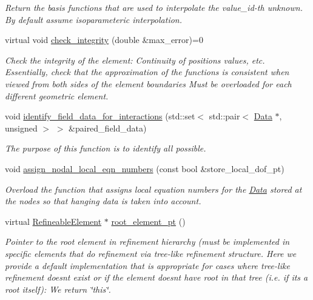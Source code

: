 \begin{DoxyCompactItemize}
\begin{DoxyCompactList}\small\item\em Return the basis functions that are used to interpolate the value\+\_\+id-\/th unknown. By default assume isoparameteric interpolation. \end{DoxyCompactList}\item 
virtual void \hyperlink{classoomph_1_1RefineableElement_ae665f2d2eb0b6410ddcb101caa80922a}{check\+\_\+integrity} (double \&max\+\_\+error)=0
\begin{DoxyCompactList}\small\item\em Check the integrity of the element\+: Continuity of positions values, etc. Essentially, check that the approximation of the functions is consistent when viewed from both sides of the element boundaries Must be overloaded for each different geometric element. \end{DoxyCompactList}\item 
void \hyperlink{classoomph_1_1RefineableElement_acad7a1ad82b7d818ddbec4200b339ade}{identify\+\_\+field\+\_\+data\+\_\+for\+\_\+interactions} (std\+::set$<$ std\+::pair$<$ \hyperlink{classoomph_1_1Data}{Data} $\ast$, unsigned $>$ $>$ \&paired\+\_\+field\+\_\+data)
\begin{DoxyCompactList}\small\item\em The purpose of this function is to identify all possible. \end{DoxyCompactList}\item 
void \hyperlink{classoomph_1_1RefineableElement_ab2ac14f6019818fc4efb411e9486ae3c}{assign\+\_\+nodal\+\_\+local\+\_\+eqn\+\_\+numbers} (const bool \&store\+\_\+local\+\_\+dof\+\_\+pt)
\begin{DoxyCompactList}\small\item\em Overload the function that assigns local equation numbers for the \hyperlink{classoomph_1_1Data}{Data} stored at the nodes so that hanging data is taken into account. \end{DoxyCompactList}\item 
virtual \hyperlink{classoomph_1_1RefineableElement}{Refineable\+Element} $\ast$ \hyperlink{classoomph_1_1RefineableElement_a2528930c573e50ff2eca36619713e051}{root\+\_\+element\+\_\+pt} ()
\begin{DoxyCompactList}\small\item\em Pointer to the root element in refinement hierarchy (must be implemented in specific elements that do refinement via tree-\/like refinement structure. Here we provide a default implementation that is appropriate for cases where tree-\/like refinement doesn\textquotesingle{}t exist or if the element doesn\textquotesingle{}t have root in that tree (i.\+e. if it\textquotesingle{}s a root itself)\+: We return \char`\"{}this\char`\"{}. \end{DoxyCompactList}\item 

\end{DoxyCompactItemize}

